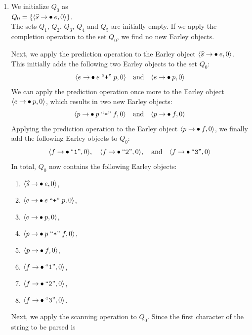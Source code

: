 \begin{enumerate}
\item We initialize $Q_0$ as
      \\[0.2cm]
      \hspace*{1.3cm}
      $Q_0 = \{ \pair(\widehat{s} \rightarrow \mdot e, 0) \}$. 
      \\[0.2cm]
      The sets $Q_1$, $Q_2$, $Q_3$, $Q_4$ and $Q_5$ are initially empty. If we apply the completion operation
      to the set $Q_0$, we find no new Earley objects.

      Next, we apply the prediction operation to the Earley object  
      $\pair(\widehat{s} \rightarrow \mdot e, 0)$. This initially adds the following two Earley objects to
      the set $Q_0$: 
      \[
        \pair(e \rightarrow \mdot e \;\squoted{+}\; p, 0) 
        \quad \text{and} \quad 
        \pair(e \rightarrow \mdot p, 0)
      \]  
      We can apply the prediction operation once more to the Earley object $\pair(e \rightarrow \mdot p, 0)$,
      which results in two new Earley objects:   
      \[
        \pair(p \rightarrow \mdot p \;\squoted{*}\; f, 0) 
        \quad \text{and} \quad 
        \pair(p \rightarrow \mdot f, 0)
      \]  
      Applying the prediction operation to the Earley object $\pair(p \rightarrow \mdot f, 0)$, we finally
      add the following Earley objects to $Q_0$:   
      \[
        \pair(f \rightarrow \mdot \squoted{1}, 0), \quad 
        \pair(f \rightarrow \mdot \squoted{2}, 0), \quad \text{and} \quad 
        \pair(f \rightarrow \mdot \squoted{3}, 0)
      \]  
      In total, $Q_0$ now contains the following Earley objects:  
      \begin{enumerate}
      \item $\pair(\widehat{s} \rightarrow \mdot e, 0)$,
      \item $\pair(e \rightarrow \mdot e \;\squoted{+}\; p, 0)$,
      \item $\pair(e \rightarrow \mdot p, 0)$,
      \item $\pair(p \rightarrow \mdot p \;\squoted{*}\; f, 0)$,
      \item $\pair(p \rightarrow \mdot f, 0)$,
      \item $\pair(f \rightarrow \mdot \squoted{1}, 0)$,
      \item $\pair(f \rightarrow \mdot \squoted{2}, 0)$,
      \item $\pair(f \rightarrow \mdot \squoted{3}, 0)$.
      \end{enumerate}
      Next, we apply the scanning operation to $Q_0$. Since the first character of the string to be parsed is

\end{enumerate}
